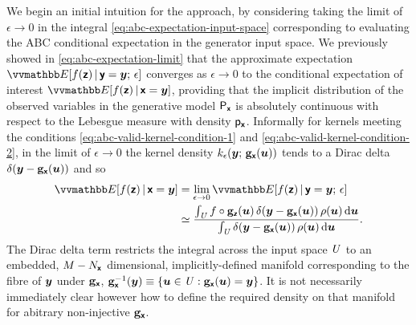 We begin an initial intuition for the approach, by considering taking the limit of $\epsilon \to 0$ in the integral \eqref{eq:abc-expectation-input-space} corresponding to evaluating the \ac{ABC} conditional expectation in the generator input space. We previously showed in \eqref{eq:abc-expectation-limit} that the approximate expectation $\expc{f(\rvct{z}) \gvn \rvct{y}= \vct{y};\,\epsilon}$ converges as $\epsilon \to 0$ to the conditional expectation of interest $\expc{f(\rvct{z}) \gvn \rvct{x} = \vct{y}}$, providing that the implicit distribution of the observed variables in the generative model $\mathsf{P}_{\boldsymbol{\mathsf{x}}}$ is absolutely continuous with respect to the Lebesgue measure with density $\mathsf{p}_{\boldsymbol{\mathsf{x}}}$. Informally for kernels meeting the conditions \eqref{eq:abc-valid-kernel-condition-1} and \eqref{eq:abc-valid-kernel-condition-2}, in the limit of $\epsilon \to 0$ the kernel density $k_\epsilon\lpa{\vct{y}};\,\genfunc_{\rvct{x}}(\vct{u})\rpa$ tends to a Dirac delta ${\delta}\lpa\vct{y} - \genfunc_{\rvct{x}}(\vct{u})\rpa$ and so
\begin{align}\label{eq:expectation-input-space-limit}
  \expc{f(\rvct{z}) \gvn \rvct{x}=\vct{y}} &=
  \lim_{\epsilon\to 0}  \expc{f(\rvct{z}) \gvn \rvct{y}=\vct{y};\,\epsilon} 
  \\
  &\simeq
  \frac{
  \int_{\set{U}} 
    f\circ\genfunc_{\rvct{z}}(\vct{u}) \,
    \delta\lpa\vct{y} - \genfunc_{\rvct{x}}(\vct{u})\rpa\,
    \rho(\vct{u})
  \,\dr\vct{u}
  }
  {
    \int_{\set{U}} 
    \delta\lpa\vct{y} - \genfunc_{\rvct{x}}(\vct{u})\rpa\,
    \rho(\vct{u})
  \,\dr\vct{u}
  }.
\end{align}
The Dirac delta term restricts the integral across the input space $\mathit{U}$ to an embedded, $M - N_{\boldsymbol{\mathsf{x}}}$ dimensional, implicitly-defined manifold corresponding to the fibre of $\boldsymbol{y}$ under ${\mathbf{g}}_{\boldsymbol{\mathsf{x}}}$, $\preimage{\genfunc_{\rvct{x}}}{\vct{y}} \equiv \fset{\vct{u} \in \set{U} :  \genfunc_{\rvct{x}}(\vct{u}) = \vct{y}}$. It is not necessarily immediately clear however how to define the required density on that manifold for abitrary non-injective ${\mathbf{g}}_{\boldsymbol{\mathsf{x}}}$.

